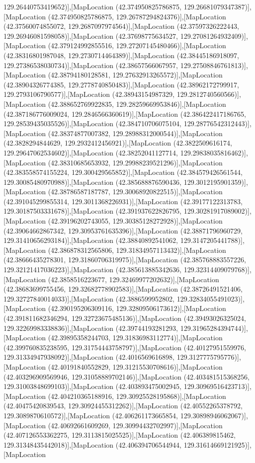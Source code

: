 129.26440753419652)],[MapLocation (42.374950825786875, 129.26681079347387)],[MapLocation (42.374950825786875, 129.26787294824376)],[MapLocation (42.37560074855072, 129.2687097974564)],[MapLocation (42.37597326222443, 129.26946081598058)],[MapLocation (42.37698775634527, 129.27081264932409)],[MapLocation (42.379124992855516, 129.27207145480466)],[MapLocation (42.38316801987048, 129.2730714464389)],[MapLocation (42.38445186918097, 129.27386538030734)],[MapLocation (42.38657566067957, 129.27508846761813)],[MapLocation (42.38794180128581, 129.27632913265572)],[MapLocation (42.38904326774385, 129.2778740850483)],[MapLocation (42.38962172799917, 129.2793106790577)],[MapLocation (42.38943154987329, 129.2812740560566)],[MapLocation (42.388652769922835, 129.28259669953846)],[MapLocation (42.387186776009024, 129.2846566360619)],[MapLocation (42.386422417186765, 129.28539435035526)],[MapLocation (42.384710706075104, 129.28776542312443)],[MapLocation (42.38374877007382, 129.28988312000544)],[MapLocation (42.3828294844629, 129.2932412456921)],[MapLocation (42.3822509616174, 129.29647062534602)],[MapLocation (42.38252041127714, 129.29838035816462)],[MapLocation (42.38310685653932, 129.29988239521296)],[MapLocation (42.383558574155224, 129.300429565852)],[MapLocation (42.384579426561544, 129.30085480970988)],[MapLocation (42.385688876590436, 129.3012195901359)],[MapLocation (42.38786587187787, 129.30068920822515)],[MapLocation (42.391045299855314, 129.3011368226931)],[MapLocation (42.39177122313783, 129.30187503331678)],[MapLocation (42.391937622826795, 129.30281917089002)],[MapLocation (42.39196202743055, 129.30385128272928)],[MapLocation (42.39064662867342, 129.30953761635396)],[MapLocation (42.38871796960729, 129.31410656293184)],[MapLocation (42.38840892541062, 129.3147205441788)],[MapLocation (42.386878312565806, 129.31834957113432)],[MapLocation (42.38666435278301, 129.31860706319975)],[MapLocation (42.385768883557226, 129.32121417036223)],[MapLocation (42.385613885342636, 129.32314409079768)],[MapLocation (42.3858516223677, 129.32469977202632)],[MapLocation (42.38683699755456, 129.32682778902583)],[MapLocation (42.38726491521406, 129.32727840014033)],[MapLocation (42.3886599952802, 129.32834055491023)],[MapLocation (42.390195206309116, 129.32809506173612)],[MapLocation (42.391811682346294, 129.32723675485136)],[MapLocation (42.39493026325024, 129.32269983338836)],[MapLocation (42.39744193281293, 129.31965284394744)],[MapLocation (42.39895358244703, 129.31836983112774)],[MapLocation (42.399760835238595, 129.31754443758797)],[MapLocation (42.40127951559976, 129.31334947938092)],[MapLocation (42.4016569616898, 129.3127775795776)],[MapLocation (42.40191840552829, 129.31215530708616)],[MapLocation (42.403296909569946, 129.31058889702146)],[MapLocation (42.403481515368256, 129.31003848699103)],[MapLocation (42.403893475002945, 129.30969516423713)],[MapLocation (42.404210365188916, 129.30925528195868)],[MapLocation (42.40475420839543, 129.30924455312262)],[MapLocation (42.40552265378792, 129.3089870610572)],[MapLocation (42.406261173665854, 129.30898946062067)],[MapLocation (42.40692661609269, 129.30994432702997)],[MapLocation (42.407126553362275, 129.3113815025525)],[MapLocation (42.406389815462, 129.31348435442018)],[MapLocation (42.406394706544944, 129.31614669121925)],[MapLocation 